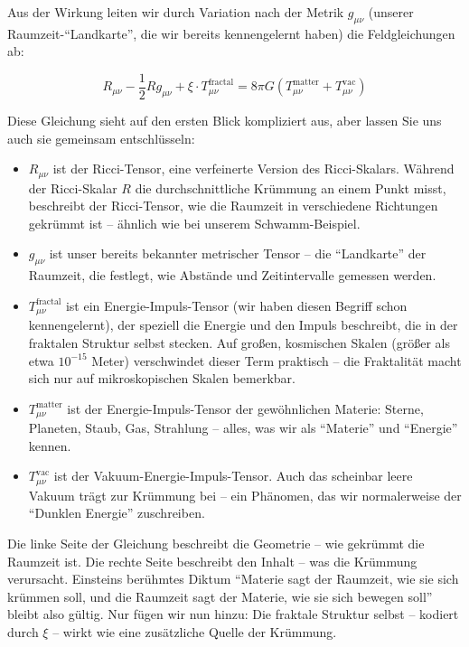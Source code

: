Aus der Wirkung leiten wir durch Variation nach der Metrik $g_{\mu\nu}$ (unserer Raumzeit-\enquote{Landkarte}, die wir bereits kennengelernt haben) die Feldgleichungen ab:

\begin{equation}
R_{\mu\nu} - \frac{1}{2} R g_{\mu\nu} + \xi \cdot T_{\mu\nu}^{\text{fractal}} = 8\pi G \left( T_{\mu\nu}^{\text{matter}} + T_{\mu\nu}^{\text{vac}} \right)
\end{equation}

Diese Gleichung sieht auf den ersten Blick kompliziert aus, aber lassen Sie uns auch sie gemeinsam entschlüsseln:

\begin{itemize}[leftmargin=*]
\item \textbf{$R_{\mu\nu}$} ist der Ricci-Tensor, eine verfeinerte Version des Ricci-Skalars. Während der Ricci-Skalar $R$ die durchschnittliche Krümmung an einem Punkt misst, beschreibt der Ricci-Tensor, wie die Raumzeit in verschiedene Richtungen gekrümmt ist – ähnlich wie bei unserem Schwamm-Beispiel.

\item \textbf{$g_{\mu\nu}$} ist unser bereits bekannter metrischer Tensor – die \enquote{Landkarte} der Raumzeit, die festlegt, wie Abstände und Zeitintervalle gemessen werden.

\item \textbf{$T_{\mu\nu}^{\text{fractal}}$} ist ein Energie-Impuls-Tensor (wir haben diesen Begriff schon kennengelernt), der speziell die Energie und den Impuls beschreibt, die in der fraktalen Struktur selbst stecken. Auf großen, kosmischen Skalen (größer als etwa $10^{-15}$ Meter) verschwindet dieser Term praktisch – die Fraktalität macht sich nur auf mikroskopischen Skalen bemerkbar.

\item \textbf{$T_{\mu\nu}^{\text{matter}}$} ist der Energie-Impuls-Tensor der gewöhnlichen Materie: Sterne, Planeten, Staub, Gas, Strahlung – alles, was wir als \enquote{Materie} und \enquote{Energie} kennen.

\item \textbf{$T_{\mu\nu}^{\text{vac}}$} ist der Vakuum-Energie-Impuls-Tensor. Auch das scheinbar leere Vakuum trägt zur Krümmung bei – ein Phänomen, das wir normalerweise der \enquote{Dunklen Energie} zuschreiben.
\end{itemize}

Die linke Seite der Gleichung beschreibt die Geometrie – wie gekrümmt die Raumzeit ist. Die rechte Seite beschreibt den Inhalt – was die Krümmung verursacht. Einsteins berühmtes Diktum \enquote{Materie sagt der Raumzeit, wie sie sich krümmen soll, und die Raumzeit sagt der Materie, wie sie sich bewegen soll} bleibt also gültig. Nur fügen wir nun hinzu: Die fraktale Struktur selbst – kodiert durch $\xi$ – wirkt wie eine zusätzliche Quelle der Krümmung.

